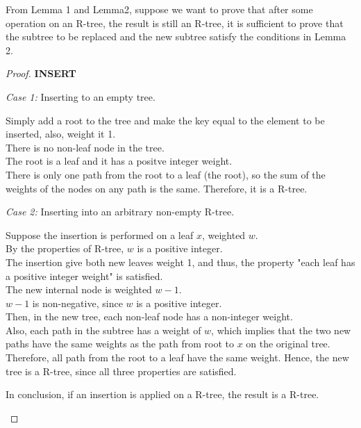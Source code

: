 \documentclass[10pt]{article}
\begin{document}
\begin{enumerate}
	From Lemma 1 and Lemma2, suppose we want to prove that after some operation
	on an R-tree, the result is still an R-tree, it is sufficient to prove that
	the subtree to be replaced and the new subtree satisfy the conditions in
	Lemma 2.
	
	\begin{proof}
	\textbf{INSERT}
	\begin{addmargin}[1em]{0em}
		\textit{Case 1:} Inserting to an empty tree.
		\begin{addmargin}[1em]{0em}
			Simply add a root to the tree and make the key equal to the element to be inserted, also, weight it 1. \\
			There is no non-leaf node in the tree. \\
			The root is a leaf and it has a positve integer weight. \\
			There is only one path from the root to a leaf (the root), so the sum of the weights of the nodes on any path is the same.
			Therefore, it is a R-tree.
		\end{addmargin}
		\textit{Case 2:} Inserting into an arbitrary non-empty R-tree.
		\begin{addmargin}[1em]{0em}
			Suppose the insertion is performed on a leaf $x$, weighted $w$. \\
			By the properties of R-tree, $w$ is a positive integer. \\
			The insertion give both new leaves weight 1, and thus, the property "each leaf has a positive integer weight" is satisfied. \\
			The new internal node is weighted $w-1$. \\
			$w-1$ is non-negative, since $w$ is a positive integer. \\
			Then, in the new tree, each non-leaf node has a non-integer weight. \\
			Also, each path in the subtree has a weight of $w$, which implies that the two new paths have the same weights as the path from root to $x$ on the original tree.
			Therefore, all path from the root to a leaf have the same weight.
			Hence, the new tree is a R-tree, since all three properties are satisfied.
		\end{addmargin}

		In conclusion, if an insertion is applied on a R-tree, the result is a R-tree.
	\end{addmargin}


\end{proof}
\end{enumerate}
\end{document}
